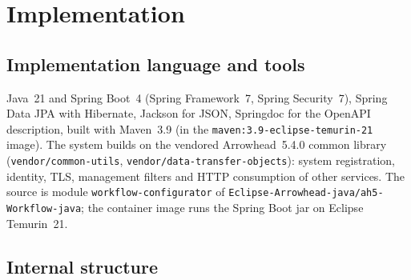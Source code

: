 \documentclass[a4paper]{arrowhead}
\begin{document}
\newpage
\section{Implementation}
\label{sec:implementation}

\subsection{Implementation language and tools}
Java~21 and Spring Boot~4 (Spring Framework~7, Spring Security~7), Spring Data JPA with Hibernate, Jackson for JSON,
Springdoc for the OpenAPI description, built with Maven~3.9 (in the \texttt{maven:3.\allowbreak{}9-\allowbreak{}eclipse-\allowbreak{}temurin-\allowbreak{}21} image). The
system builds on the vendored Arrowhead~5.4.0 common library (\texttt{vendor/\allowbreak{}common-\allowbreak{}utils},
\texttt{vendor/\allowbreak{}data-\allowbreak{}transfer-\allowbreak{}objects}): system registration, identity, TLS, management filters and HTTP consumption
of other services. The source is module \texttt{workflow-\allowbreak{}configurator} of \texttt{Eclipse-\allowbreak{}Arrowhead-\allowbreak{}java/\allowbreak{}ah5-\allowbreak{}Workflow-\allowbreak{}java}; the
container image runs the Spring Boot jar on Eclipse Temurin~21.

\subsection{Internal structure}
\end{document}

